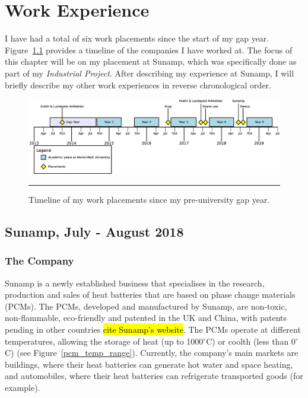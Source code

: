 \chapter{Work Experience} %

\label{Chapter2} %


I have had a total of six work placements since the start of my gap year.
Figure~\ref{timeline} provides a timeline of the companies I have worked at.
The focus of this chapter will be on my placement at Sunamp, which was specifically done as part of my \textit{Industrial Project}.
After describing my experience at Sunamp, I will briefly describe my other work experiences in reverse chronological order.

\begin{figure}[htbp]
	\centering
	\includegraphics[width=\textwidth]{figures/IP-Timeline.eps}
	\rule{\textwidth}{0.5pt} %
	\caption{Timeline of my work placements since my pre-university gap year.}
	\label{timeline}
\end{figure}



\section{Sunamp, July - August 2018}

\subsection*{The Company}

Sunamp is a newly established business that specialises in the research, production and sales of heat batteries that are based on phase change materials (PCMs).
The PCMs, developed and manufactured by Sunamp, are non-toxic, non-flammable, eco-friendly and patented in the UK and China, with patents pending in other countries 
\hl{cite Sunamp's website}.
The PCMs operate at different temperatures, allowing the storage of heat (up to 1000$^{\circ}$C) or coolth (less than 0$^{\circ}$C) (see Figure~\ref{pcm_temp_range}).
Currently, the company's main markets are buildings, where their heat batteries can generate hot water and space heating, and automobiles, where their heat batteries can refrigerate transported goods (for example).

